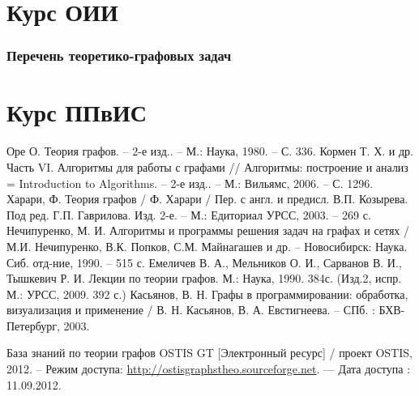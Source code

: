 \documentclass[a4paper,12pt]{report}
\begin{document}

\tableofcontents

\part{Курс ОИИ}


\clearpage

{}
\section*{Перечень теоретико-графовых задач}
\label{sec:tasks_list}






\part{Курс ППвИС}




%

\newpage 
\begin{thebibliography}{99}

 Оре О. Теория графов. -- 2-е изд.. -- М.: Наука,
  1980. -- С. 336.
 Кормен Т. Х. и др. Часть VI. Алгоритмы для
  работы с графами // Алгоритмы: построение и анализ = Introduction to
  Algorithms. -- 2-е изд.. -- М.: Вильямс, 2006. -- С. 1296.
 Харари, Ф. Теория графов / Ф. Харари / Пер. с
  англ. и предисл. В.П. Козырева. Под ред. Г.П. Гаврилова. Изд. 2-е. --
  М.: Едиториал УРСС, 2003. -- 269 с.
 Нечипуренко, М. И. Алгоритмы и программы
  решения задач на графах и сетях / М.И. Нечипуренко, В.К. Попков,
  С.М. Майнагашев и др. -- Новосибирск: Наука. Сиб. отд-ние, 1990. --
  515 с.
 Емеличев В. А., Мельников О. И., Сарванов
  В. И., Тышкевич Р. И. Лекции по теории графов. М.: Наука,
  1990. 384с. (Изд.2, испр. М.: УРСС, 2009. 392 с.)
 Касьянов, В. Н. Графы в программировании:
  обработка, визуализация и применение / В. Н. Касьянов,
  В. А. Евстигнеева. -- СПб. : БХВ-Петербург, 2003.

 База знаний по теории графов OSTIS GT [Электронный
  ресурс] / проект OSTIS, 2012. -- Режим доступа:
  \href{http://ostisgraphstheo.sourceforge.net}{http://ostisgraphstheo.sourceforge.net}. ---
  Дата доступа : 11.09.2012.

\end{thebibliography}
\end{document}
